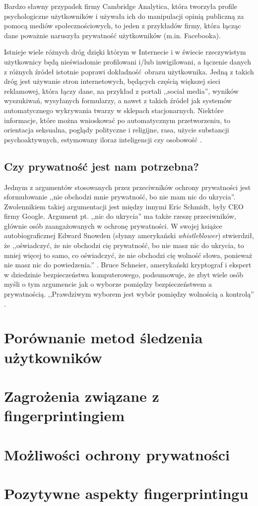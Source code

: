 Bardzo sławny przypadek firmy Cambridge Analytica, która tworzyła profile
psychologiczne użytkowników i używała ich do manipulacji opinią publiczną za
pomocą mediów społecznościowych, to jeden z przykładów firmy, która łącząc dane
poważnie naruszyła prywatność użytkowników (m.in. Facebooka).

Istnieje wiele różnych dróg dzięki którym w Internecie i w świecie rzeczywistym
użytkownicy będą nieświadomie profilowani i/lub inwigilowani, a łączenie danych
z różnych źródeł istotnie poprawi dokładność obrazu użytkownika. Jedną z takich
dróg jest używanie stron internetowych, będących częścią większej sieci
reklamowej, która łączy dane, na przykład z portali ,,social media'', wyników
wyszukiwań, wysyłanych formularzy, a nawet z takich źródeł jak systemów
automatycznego wykrywania twarzy w sklepach stacjonarnych. Niektóre informacje,
które można wnioskować po automatycznym przetworzeniu, to orientacja seksualna,
poglądy polityczne i religijne, rasa, użycie substancji psychoaktywnych,
estymowany iloraz inteligencji czy osobowość \cite{kosinski2013private}.

\subsection{Czy prywatność jest nam potrzebna?}
Jednym z argumentów stosowanych przez przeciwników ochrony prywatności jest
sformułowanie ,,nie obchodzi mnie prywatność, bo nie mam nic do ukrycia''.
Zwolennikiem takiej argumentacji jest między innymi Eric Schmidt, były CEO firmy
Google. Argument pt. ,,nic do ukrycia'' ma także rzeszę przeciwników, głównie
osób zaangażowanych w ochronę prywatności. W swojej książce autobiograficznej
Edward Snowden (słynny amerykański \emph{whistleblower}) stwierdził, że
,,oświadczyć, że nie obchodzi cię prywatność, bo nie masz nic do ukrycia, to
mniej więcej to samo, co oświadczyć, że nie obchodzi cię wolność słowa, ponieważ
nie masz nic do powiedzenia.'' \cite{snowden2019pamiec}. Bruce Schneier,
amerykański kryptograf i ekspert w dziedzinie bezpieczeństwa komputerowego,
podsumowuje, że zbyt wiele osób myśli o tym argumencie jak o wyborze pomiędzy
bezpieczeństwem a prywatnością. ,,Prawdziwym wyborem jest wybór pomiędzy
wolnością a kontrolą'' \cite{schneier2006eternal}.

\section{Porównanie metod śledzenia użytkowników}

\section{Zagrożenia związane z fingerprintingiem}

\section{Możliwości ochrony prywatności}

\section{Pozytywne aspekty fingerprintingu}
